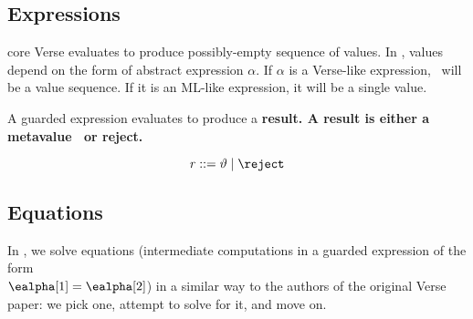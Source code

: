 \documentclass[]{article}
\begin{document}
        
        
        
        
        
        
    
        
        \subsection{Expressions}
        
        core Verse evaluates to produce possibly-empty sequence of values. In
        \VMinus, values depend on the form of abstract expression $\alpha.$ If
        $\alpha$ is a Verse-like expression, \valpha ~will be a value sequence. If
        it is an ML-like expression, it will be a single value. 
        
        A guarded expression evaluates to produce a \bf{result}. A result is either
        a metavalue \valpha ~or reject. 
        
        \[\it{r} \; \rm{::=} \; \vartheta \;|\; \reject \]
        
        
        
        \bigskip
    \subsection{Equations}
    
    In \VMinus, we solve equations (intermediate computations in a guarded
    expression of the form \\$\ealpha[1] = \ealpha[2]$) in a similar way to the
    authors of the original Verse paper: we pick one, attempt to solve for it, and
    move on. 
    
\end{document}
